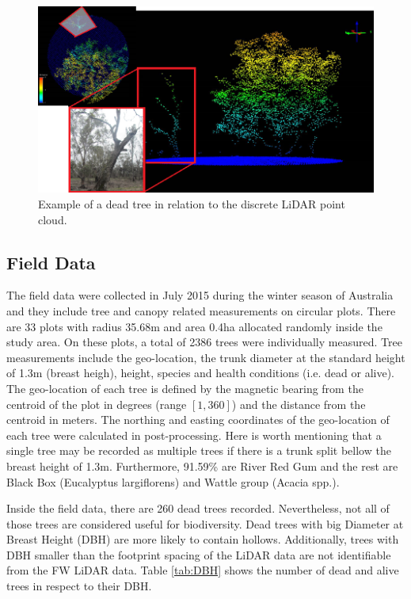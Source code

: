 \documentclass{subfiles}
\begin{document}
\begin{figure} [h!]
	\centering
	\includegraphics[width=\textwidth]{img/dead/DeadTreeInLiDAR}
	\caption{Example of a dead tree in relation to the discrete LiDAR point cloud.}
	\label{fig:DeadTreeInLiDAR}
\end{figure}



\subsection{Field Data}\label{sec:fieldData}

\par The field data were collected in July 2015 during the winter season of Australia and they include tree and canopy related measurements on circular plots. There are 33 plots with radius 35.68m and area 0.4ha  allocated randomly inside the study area. On these plots, a total of 2386 trees were individually measured.  Tree measurements include the geo-location, the trunk diameter at the standard height of 1.3m (breast heigh), height, species and health conditions (i.e. dead or alive). The geo-location of each tree is defined by the magnetic bearing from the centroid of the plot in degrees (range $[1,360]$) and the distance from the centroid in meters. The northing and easting coordinates of the geo-location of each tree were calculated in post-processing. Here is worth mentioning that a single tree may be recorded as multiple trees if there is a trunk split bellow the breast height of 1.3m. Furthermore, 91.59\% are River Red Gum and the rest are Black Box (Eucalyptus largiflorens) and Wattle group (Acacia spp.). 

\par Inside the field data, there are 260 dead trees recorded. Nevertheless, not all of those trees are considered useful for biodiversity. Dead trees with big Diameter at Breast Height (DBH) are more likely to contain hollows. Additionally, trees with DBH smaller than the footprint spacing of the LiDAR data are not identifiable from the FW LiDAR data. Table \ref{tab:DBH} shows the number of dead and alive trees in respect to their DBH. 
\end{document}
